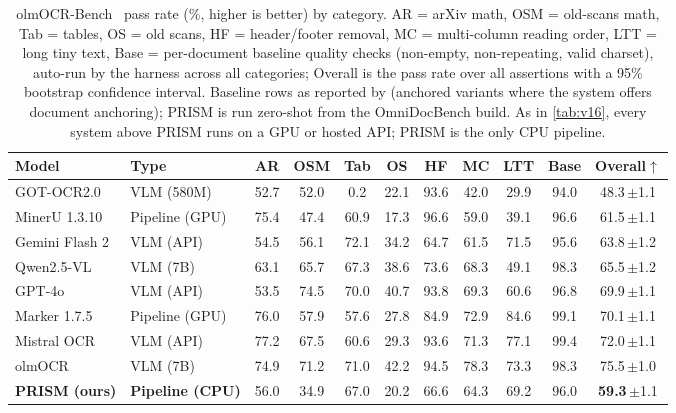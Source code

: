 \begin{table}[t]
\centering
\caption{olmOCR-Bench~\cite{olmocr} pass rate (\%, higher is better) by category. AR = arXiv math, OSM = old-scans math, Tab = tables, OS = old scans, HF = header/footer removal, MC = multi-column reading order, LTT = long tiny text, Base = per-document baseline quality checks (non-empty, non-repeating, valid charset), auto-run by the harness across all categories; Overall is the pass rate over all assertions with a 95\% bootstrap confidence interval. Baseline rows as reported by \citet{olmocr} (anchored variants where the system offers document anchoring); PRISM is run zero-shot from the OmniDocBench build. As in \cref{tab:v16}, every system above PRISM runs on a GPU or hosted API; PRISM is the only CPU pipeline.}
\label{tab:olmobench}
\small
\setlength{\tabcolsep}{4pt}
\begin{tabular}{llccccccccc}
\toprule
Model & Type & AR & OSM & Tab & OS & HF & MC & LTT & Base & Overall$\uparrow$ \\
\midrule
GOT-OCR2.0        & VLM (580M)      & 52.7 & 52.0 & 0.2  & 22.1 & 93.6 & 42.0 & 29.9 & 94.0 & 48.3{\scriptsize\,$\pm$1.1} \\
MinerU 1.3.10     & Pipeline (GPU)  & 75.4 & 47.4 & 60.9 & 17.3 & 96.6 & 59.0 & 39.1 & 96.6 & 61.5{\scriptsize\,$\pm$1.1} \\
Gemini Flash 2    & VLM (API)       & 54.5 & 56.1 & 72.1 & 34.2 & 64.7 & 61.5 & 71.5 & 95.6 & 63.8{\scriptsize\,$\pm$1.2} \\
Qwen2.5-VL        & VLM (7B)        & 63.1 & 65.7 & 67.3 & 38.6 & 73.6 & 68.3 & 49.1 & 98.3 & 65.5{\scriptsize\,$\pm$1.2} \\
GPT-4o            & VLM (API)       & 53.5 & 74.5 & 70.0 & 40.7 & 93.8 & 69.3 & 60.6 & 96.8 & 69.9{\scriptsize\,$\pm$1.1} \\
Marker 1.7.5      & Pipeline (GPU)  & 76.0 & 57.9 & 57.6 & 27.8 & 84.9 & 72.9 & 84.6 & 99.1 & 70.1{\scriptsize\,$\pm$1.1} \\
Mistral OCR       & VLM (API)       & 77.2 & 67.5 & 60.6 & 29.3 & 93.6 & 71.3 & 77.1 & 99.4 & 72.0{\scriptsize\,$\pm$1.1} \\
olmOCR            & VLM (7B)        & 74.9 & 71.2 & 71.0 & 42.2 & 94.5 & 78.3 & 73.3 & 98.3 & 75.5{\scriptsize\,$\pm$1.0} \\
\midrule
\textbf{PRISM (ours)} & \textbf{Pipeline (CPU)} & 56.0 & 34.9 & 67.0 & 20.2 & 66.6 & 64.3 & 69.2 & 96.0 & \textbf{59.3}{\scriptsize\,$\pm$1.1} \\
\bottomrule
\end{tabular}
\end{table}

